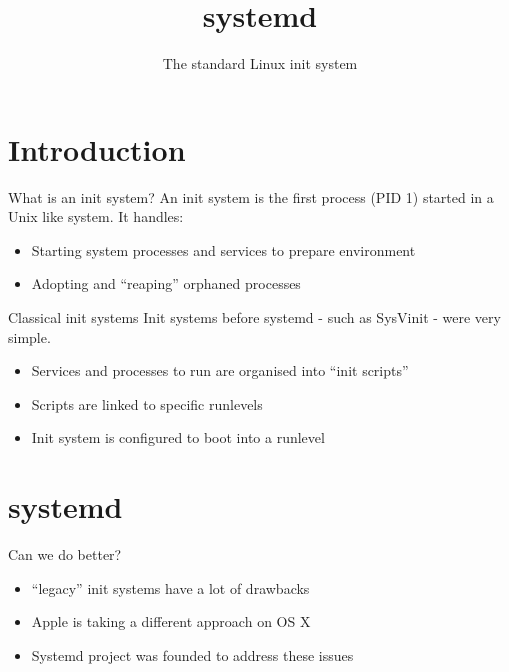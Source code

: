 \documentclass[14pt]{beamer}
\title{systemd}
\subtitle{The standard Linux init system}
\begin{document}

\maketitle

\section{Introduction}

\begin{frame}{What is an init system?}
  An init system is the first process (PID 1) started in a Unix like system. It handles:

  \begin{itemize}
  \item Starting system processes and services to prepare environment
  \item Adopting and ``reaping'' orphaned processes
  \end{itemize}
\end{frame}

\begin{frame}{Classical init systems}
  Init systems before systemd - such as SysVinit - were very simple.

  \begin{itemize}
  \item Services and processes to run are organised into ``init scripts''
  \item Scripts are linked to specific runlevels
  \item Init system is configured to boot into a runlevel
  \end{itemize}

\end{frame}

\section{systemd}

\begin{frame}{Can we do better?}
  \begin{itemize}
  \item ``legacy'' init systems have a lot of drawbacks
  \item Apple is taking a different approach on OS X
  \item Systemd project was founded to address these issues
  \end{itemize}
\end{frame}
\end{document}
